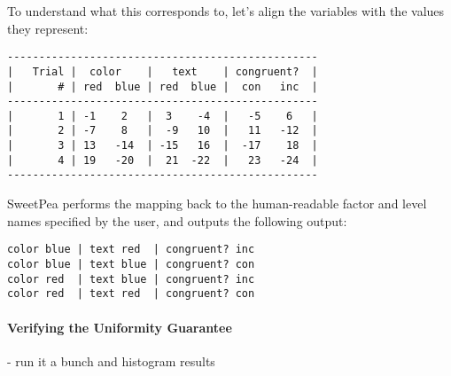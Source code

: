 To understand what this corresponds to, let's align the variables with the values they represent:

\begin{verbatim}
-------------------------------------------------
|   Trial |  color    |   text    | congruent?  |
|       # | red  blue | red  blue |  con   inc  |
-------------------------------------------------
|       1 | -1    2   |  3    -4  |   -5    6   |
|       2 | -7    8   |  -9   10  |   11   -12  |
|       3 | 13   -14  | -15   16  |  -17    18  |
|       4 | 19   -20  |  21  -22  |   23   -24  |
-------------------------------------------------
\end{verbatim}

SweetPea performs the mapping back to the human-readable factor and level names specified by the user, and outputs the following output:

\begin{verbatim}
color blue | text red  | congruent? inc
color blue | text blue | congruent? con
color red  | text blue | congruent? inc
color red  | text red  | congruent? con
\end{verbatim}


\paragraph*{Verifying the Uniformity Guarantee}

- run it a bunch and histogram results
